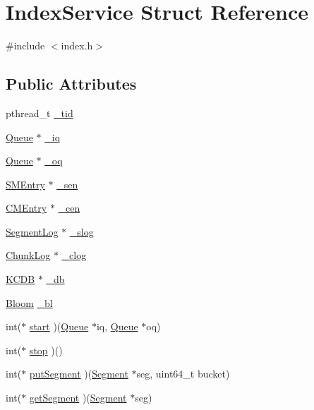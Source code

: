 \hypertarget{structIndexService}{\section{\-Index\-Service \-Struct \-Reference}
\label{structIndexService}
}


{\ttfamily \#include $<$index.\-h$>$}

\subsection*{\-Public \-Attributes}
\begin{DoxyCompactItemize}
\item 
pthread\-\_\-t \hyperlink{structIndexService_a141d6cafddb2e4b95a4b1f0b23309acd}{\-\_\-tid}
\item 
\hyperlink{structQueue}{\-Queue} $\ast$ \hyperlink{structIndexService_a181bd6964cfc8697acdceec1479114d3}{\-\_\-iq}
\item 
\hyperlink{structQueue}{\-Queue} $\ast$ \hyperlink{structIndexService_aeff079244075907b6867b69f5f9084e3}{\-\_\-oq}
\item 
\hyperlink{structSMEntry}{\-S\-M\-Entry} $\ast$ \hyperlink{structIndexService_a08a917690484534f5624b01dc12dcbe7}{\-\_\-sen}
\item 
\hyperlink{structCMEntry}{\-C\-M\-Entry} $\ast$ \hyperlink{structIndexService_aa6e028a46d131cb5861f25ef2584cb22}{\-\_\-cen}
\item 
\hyperlink{structSegmentLog}{\-Segment\-Log} $\ast$ \hyperlink{structIndexService_a0e09e9c7eb8e8118ae76097df7cb3f01}{\-\_\-slog}
\item 
\hyperlink{structChunkLog}{\-Chunk\-Log} $\ast$ \hyperlink{structIndexService_ad0e9843f1aefc56211b9f363d8d25f28}{\-\_\-clog}
\item 
\hyperlink{structKCDB}{\-K\-C\-D\-B} $\ast$ \hyperlink{structIndexService_a125e1109c0aa6005fe475e1c13f66fa3}{\-\_\-db}
\item 
\hyperlink{bloom_8h_a01fef9dc4348cef76e54814e416ab818}{\-Bloom} \hyperlink{structIndexService_adc8c1659c9d847b57fac8b834a31915a}{\-\_\-bl}
\item 
int($\ast$ \hyperlink{structIndexService_ad8d158bb13eeacdec8f716c65dfa78bc}{start} )(\hyperlink{structQueue}{\-Queue} $\ast$iq, \hyperlink{structQueue}{\-Queue} $\ast$oq)
\item 
int($\ast$ \hyperlink{structIndexService_a7225479bd31c555bd4a4c9d2698dff52}{stop} )()
\item 
int($\ast$ \hyperlink{structIndexService_a20dc255b29cc383c1fe7b3a547afa7e8}{put\-Segment} )(\hyperlink{structSegment}{\-Segment} $\ast$seg, uint64\-\_\-t bucket)
\item 
int($\ast$ \hyperlink{structIndexService_a7fb12b4cc7c9eae4c2fab7ba2ae3d42e}{get\-Segment} )(\hyperlink{structSegment}{\-Segment} $\ast$seg)
\end{DoxyCompactItemize}


